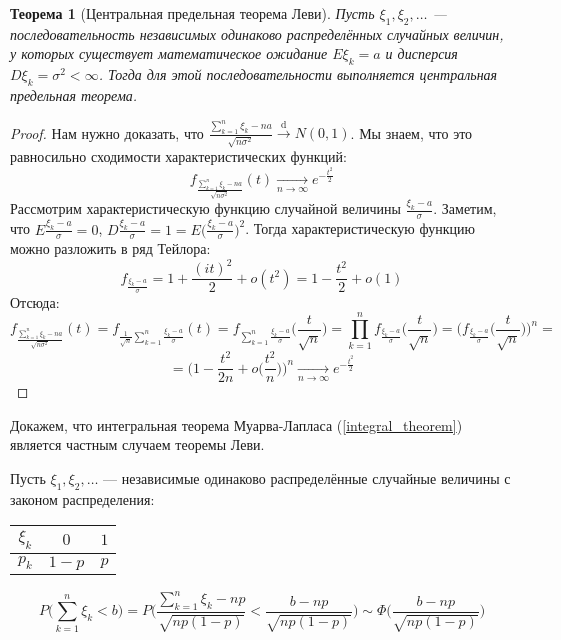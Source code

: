 \documentclass[11pt,openany,a4paper]{scrartcl}
\theoremstyle{plain}
\newtheorem{theorem}{Теорема}[subsection]
\theoremstyle{definition}
\newcommand{\underto}[1]{\xrightarrow[#1]{}}
\newcommand{\overto}[1]{\xrightarrow{#1}}
\begin{document}
\begin{theorem}[Центральная предельная теорема Леви]
    Пусть $\xi_1, \xi_2, \ldots$ — последовательность независимых одинаково распределённых 
    случайных величин, у которых существует математическое ожидание $E\xi_k = a$ и 
    дисперсия $D\xi_k = \sigma^2 < \infty$. Тогда для этой последовательности
    выполняется центральная предельная теорема.
\end{theorem}
\begin{proof}
    Нам нужно доказать, что
    $\frac{\sum\limits_{k=1}^n\xi_k - na}{\sqrt{n\sigma^2}} \overto{\mathrm d} N(0,1)$.
    Мы знаем, что это равносильно сходимости характеристических функций:
    $$
    f_{\frac{\sum\limits_{k=1}^n\xi_k - na}{\sqrt{n\sigma^2}}}(t) \underto{n \to \infty}
    e^{-\frac{t^2}{2}}
    $$
    Рассмотрим характеристическую функцию случайной величины $\frac{\xi_k - a}{\sigma}$. 
    Заметим, что $E\frac{\xi_k - a}{\sigma} = 0$, $D\frac{\xi_k - a}{\sigma} = 1 =
    E\Big(\frac{\xi_k - a}{\sigma}\Big)^2$. Тогда характеристическую функцию можно
    разложить в ряд Тейлора:
    $$
    f_{\frac{\xi_k - a}{\sigma}} = 1 + \frac{(it)^2}{2} + o(t^2) = 1 - \frac{t^2}{2} + o(1)
    $$
    Отсюда:
    $$
    f_{\frac{\sum\limits_{k=1}^n\xi_k - na}{\sqrt{n\sigma^2}}}(t) =
    f_{\frac{1}{\sqrt{n}} \sum\limits_{k=1}^n \frac{\xi_k - a}{\sigma}}(t) =
    f_{\sum\limits_{k=1}^n \frac{\xi_k - a}{\sigma}} \bigg(\frac{t}{\sqrt{n}}\bigg) =
    \prod\limits_{k=1}^n f_{\frac{\xi_k - a}{\sigma}}\bigg(\frac{t}{\sqrt{n}}\bigg) =
    \Bigg(f_{\frac{\xi_k - a}{\sigma}}\bigg(\frac{t}{\sqrt{n}}\bigg)\Bigg)^n =
    $$
    $$
    = \bigg(1 - \frac{t^2}{2n} + o\bigg(\frac{t^2}{n}\bigg)\bigg)^n \underto{n \to \infty}
    e^{-\frac{t^2}{2}}
    $$
\end{proof}

Докажем, что интегральная теорема Муарва-Лапласа (\ref{integral_theorem}) является частным
случаем теоремы Леви.

Пусть $\xi_1, \xi_2,\ldots$ — независимые одинаково распределённые случайные величины с
законом распределения:
\begin{center}
    \begin{tabular}{| c | c | c |}
        \hline
        $\xi_k$ & $0$ & $1$ \\ \hline
        $p_k$ & $1-p$ & $p$ \\ \hline
    \end{tabular}
\end{center}
    
$$
P\bigg(\sum\limits_{k=1}^n\xi_k < b) =
P\Bigg(\frac{\sum\limits_{k=1}^n \xi_k - np}{\sqrt{np(1-p)}} < \frac{b - np}{\sqrt{np(1-p)}}
\Bigg) \sim \Phi\bigg(\frac{b-np}{\sqrt{np(1-p)}}\bigg)
$$
\end{document}
